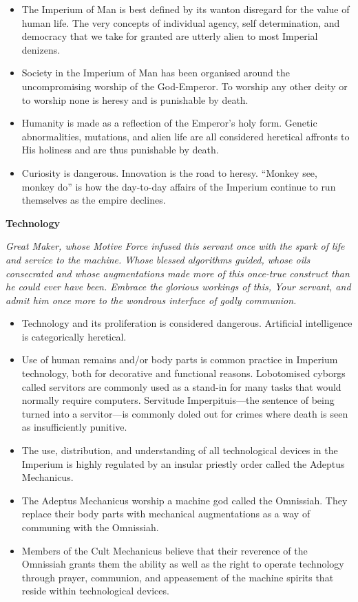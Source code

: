 \documentclass[10pt,a4paper]{article}
\newcommand{\rpgsection}[1]{%
  \vspace{0.8em}%
  {\headerfont\bfseries\Large #1}\par%
  \vspace{0.5em}%
}
\begin{document}
\begin{multicols}{2}
\begin{itemize}
  \item The Imperium of Man is best defined by its wanton disregard for the value of human life. The very concepts of individual agency, self determination, and democracy that we take for granted are utterly alien to most Imperial denizens.
  \item Society in the Imperium of Man has been organised around the uncompromising worship of the God-Emperor. To worship any other deity or to worship none is heresy and is punishable by death.
  \item Humanity is made as a reflection of the Emperor’s holy form. Genetic abnormalities, mutations, and alien life are all considered heretical affronts to His holiness and are thus punishable by death.
  \item Curiosity is dangerous. Innovation is the road to heresy. “Monkey see, monkey do” is how the day-to-day affairs of the Imperium continue to run themselves as the empire declines.
\end{itemize}

\rpgsection{Technology}
\textit{Great Maker, whose Motive Force infused this servant once with the spark of life and service to the machine. Whose blessed algorithms guided, whose oils consecrated and whose augmentations made more of this once-true construct than he could ever have been. Embrace the glorious workings of this, Your servant, and admit him once more to the wondrous interface of godly communion.}

\begin{itemize}
  \item Technology and its proliferation is considered dangerous. Artificial intelligence is categorically heretical.
  \item Use of human remains and/or body parts is common practice in Imperium technology, both for decorative and functional reasons. Lobotomised cyborgs called servitors are commonly used as a stand-in for many tasks that would normally require computers. Servitude Imperpituis—the sentence of being turned into a servitor—is commonly doled out for crimes where death is seen as insufficiently punitive.
  \item The use, distribution, and understanding of all technological devices in the Imperium is highly regulated by an insular priestly order called the Adeptus Mechanicus.
  \item The Adeptus Mechanicus worship a machine god called the Omnissiah. They replace their body parts with mechanical augmentations as a way of communing with the Omnissiah.
  \item Members of the Cult Mechanicus believe that their reverence of the Omnissiah grants them the ability as well as the right to operate technology through prayer, communion, and appeasement of the machine spirits that reside within technological devices.
\end{itemize}


\end{multicols}
\end{document}
